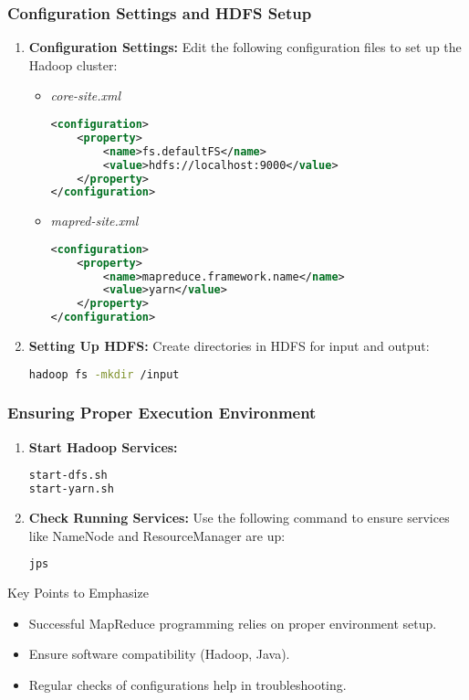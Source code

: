 \documentclass[aspectratio=169]{beamer}
\begin{document}
\begin{frame}[fragile]
    \frametitle{Configuration Settings and HDFS Setup}
    \begin{enumerate}
        \item \textbf{Configuration Settings:} Edit the following configuration files to set up the Hadoop cluster:
        \begin{itemize}
            \item \textit{core-site.xml}
            \begin{lstlisting}[language=xml]
<configuration>
    <property>
        <name>fs.defaultFS</name>
        <value>hdfs://localhost:9000</value>
    </property>
</configuration>
            \end{lstlisting}
            \item \textit{mapred-site.xml}
            \begin{lstlisting}[language=xml]
<configuration>
    <property>
        <name>mapreduce.framework.name</name>
        <value>yarn</value>
    </property>
</configuration>
            \end{lstlisting}
        \end{itemize}
        
        \item \textbf{Setting Up HDFS:} Create directories in HDFS for input and output:
        \begin{lstlisting}[language=bash]
hadoop fs -mkdir /input
        \end{lstlisting}
    \end{enumerate}
\end{frame}

\begin{frame}[fragile]
    \frametitle{Ensuring Proper Execution Environment}
    \begin{enumerate}
        \item \textbf{Start Hadoop Services:}
        \begin{lstlisting}[language=bash]
start-dfs.sh
start-yarn.sh
        \end{lstlisting}
        
        \item \textbf{Check Running Services:} Use the following command to ensure services like NameNode and ResourceManager are up:
        \begin{lstlisting}[language=bash]
jps
        \end{lstlisting}
    \end{enumerate}
    \begin{block}{Key Points to Emphasize}
        \begin{itemize}
            \item Successful MapReduce programming relies on proper environment setup.
            \item Ensure software compatibility (Hadoop, Java).
            \item Regular checks of configurations help in troubleshooting.
        \end{itemize}
    \end{block}
\end{frame}
\end{document}
